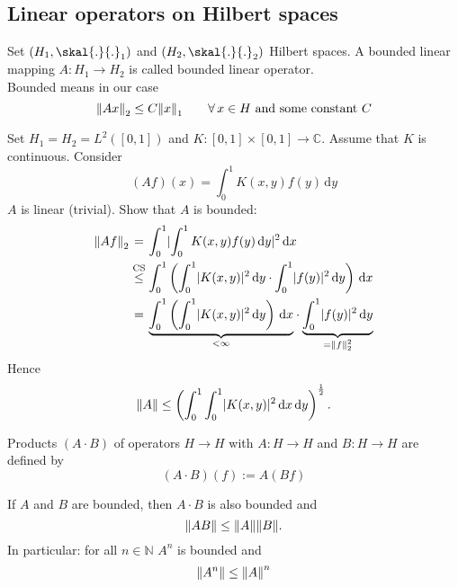 \subsection{Linear operators on Hilbert spaces} 
\label{sub:linear_operators_on_hilbert_spaces}
Set $(H_1,\skal{.}{.}_1)$ and $(H_2, \skal{.}{.}_2)$ Hilbert spaces. A bounded linear mapping $A: H_1 \to H_2$ is called bounded linear operator. \\
Bounded means in our case
\[
	\norm{Ax}_2 \leq C \norm{x}_1 \qquad \forall\, x \in H \text{ and some constant }C
\] 
\begin{beispiel}
	Set $H_1 = H_2 = L^2([0,1])$ and $K: [0,1] \times [0,1] \to \mathbb{C}$. Assume that $K$ is continuous. Consider
	\[
		(Af)(x) = \int_{0}^{1}K(x,y)f(y) \,\mathrm{d}y
	\]
	$A$ is linear (trivial). Show that $A$ is bounded:
	\begin{align*}
		\norm{Af}_2 &\stackrel{\hphantom{\text{CS}}}{=} \int_{0}^{1} \abs{\int_{0}^{1}K(x,y)f(y) \,\mathrm{d}y}^2 \,\mathrm{d}x \\
		&\stackrel{\text{CS}}{\leq} \int_{0}^{1} \left( \int_{0}^{1}\abs{K(x,y)}^2 \,\mathrm{d}y  \cdot \int_{0}^{1}\abs{f(y)}^2 \,\mathrm{d}y \right)\,\mathrm{d}x \\
		&\stackrel{\hphantom{\text{CS}}}{=} \underset{< \infty}{\underbrace{\int_{0}^{1} \left( \int_{0}^{1} \abs{K(x,y)}^2 \,\mathrm{d}y \right) \,\mathrm{d}x}}
		\cdot \underset{= \norm{f}_2^2}{\underbrace{ \int_{0}^{1}\abs{f(y)}^2 \,\mathrm{d}y}}
	\end{align*}
	Hence
	\[
		\norm{A} \leq \left( \int_{0}^{1} \int_{0}^{1} \abs{K(x,y)}^2 \,\mathrm{d}x \,\mathrm{d}y \right)^{\frac{1}{2}}.
	\]
\end{beispiel}
	Products $(A \cdot B)$ of operators $H \to H$ with $A: H \to H$ and $B: H \to H$ are defined by
	\[
		(A \cdot B)(f) := A(Bf)
	\]
\begin{satz}
	If $A$ and $B$ are bounded, then $A \cdot B$ is also bounded and 
	\[
		\norm{AB} \leq \norm{A}\norm{B}.
	\]
	In particular: for all $n \in \mathbb{N}$ $A^n$ is bounded and 
	\[
		\norm{A^n} \leq \norm{A}^n
	\]
\end{satz}